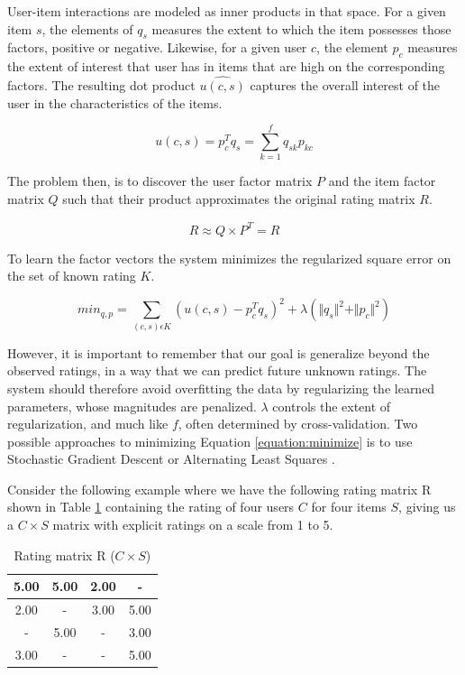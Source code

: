User-item interactions are modeled as inner products in that space. For a given
item $s$, the elements of $q_{s}$ measures the extent to which the item
possesses those factors, positive or negative. Likewise, for a given user $c$,
the element $p_{c}$ measures the extent of interest that user has in items that
are high on the corresponding factors. The resulting dot product $\hat{u(c,s)}$
captures the overall interest of the user in the characteristics of the items.

\begin{equation}
u(c,s) = p_{c}^{T}q_{s} = \sum_{k=1}^{f} q_{sk}p_{kc}
\end{equation}

The problem then, is to discover the user factor matrix $P$ and the item factor
matrix $Q$ such that their product approximates the original rating matrix $R$.

\begin{equation}
R \approx Q \times P^{T} = \hat{R}
\label{equation:dotproduct}
\end{equation}

To learn the factor vectors the system minimizes the regularized square error
on the set of known rating $K$.

\begin{equation}
\label{equation:minimize}
min_{q, p} = \sum_{(c,s)\epsilon K} (u(c,s) - p^{T}_{c}q_{s})^{2} + \lambda ( \Vert q_{s} \Vert ^{2} + \Vert p_{c} \Vert ^{2})
\end{equation}

However, it is important to remember that our goal is generalize beyond the
observed ratings, in a way that we can predict future unknown ratings. The
system should therefore avoid overfitting the data by regularizing the learned
parameters, whose magnitudes are penalized. $\lambda$ controls the extent of
regularization, and much like $f$, often determined by cross-validation. Two
possible approaches to minimizing Equation \ref{equation:minimize} is to use
Stochastic Gradient Descent or Alternating Least Squares \citep{Koren2009}.\newline

Consider the following example where we have the following rating matrix R
shown in Table \ref{table:ratingMatrix} containing the rating of four users $C$
for four items $S$, giving us a $C \times S$ matrix with explicit ratings on a
  scale from 1 to 5.

\begin{table}[!htbp]
    \centering
    \begin{tabular}{|c|c|c|c|}
    \hline
    5.00    & 5.00  & 2.00 & -    \\ \hline
    2.00    & -     & 3.00 & 5.00 \\ \hline
     -      & 5.00  & -    & 3.00 \\ \hline
    3.00    & -     & -    & 5.00 \\ \hline
    \end{tabular}
    \caption{Rating matrix R ($C \times S$)}
    \label{table:ratingMatrix}
\end{table}

